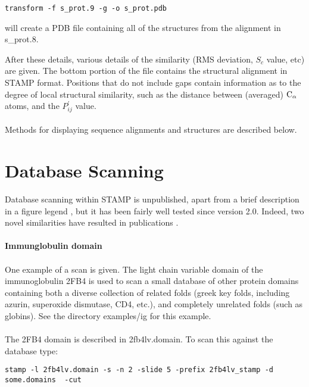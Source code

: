 \begin{scriptsize}\begin{verbatim}
transform -f s_prot.9 -g -o s_prot.pdb
\end{verbatim} \end{scriptsize}

will create a PDB file containing all of the structures from the  alignment in s\_prot.8.

After these details, various details of the similarity (RMS deviation, 
$S_{c}$ value, etc) are given.  The bottom portion of the file contains 
the structural alignment in STAMP format.  Positions that do not include 
gaps contain information as to the degree of local structural similarity, 
such as the distance between (averaged) ${\rm C}_{\alpha}$ atoms, and the 
$P_{ij}^{\prime}$ value.\\
\\
Methods for displaying sequence alignments and structures are described below.

\section{Database Scanning}

Database scanning within STAMP is unpublished, apart from a brief description in a figure 
legend \cite{matthews94}, but it has been fairly well tested
since version 2.0.  Indeed, two novel similarities have resulted
in publications \cite{rb93b,matthews94}.\\
\\
{\bf Immunglobulin domain}\\
\\
One example of a scan is given.  The light chain variable domain
of the immunoglobulin 2FB4 is used to scan a small database of
other protein domains containing both a diverse collection of
related folds (greek key folds, including azurin, superoxide
dismutase, CD4, etc.), and completely unrelated folds (such as
globins).  See the directory examples/ig for this example.\\
\\
The 2FB4 domain is described in 2fb4lv.domain.  To scan this 
against the database type:\\

\begin{scriptsize}\begin{verbatim}
stamp -l 2fb4lv.domain -s -n 2 -slide 5 -prefix 2fb4lv_stamp -d some.domains  -cut
\end{verbatim} \end{scriptsize}

